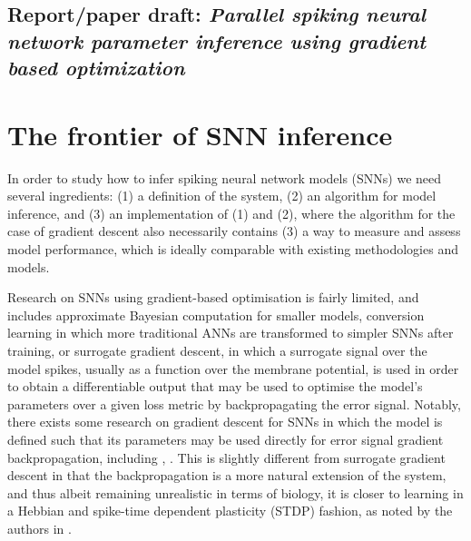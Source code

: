 \documentclass[mphil,deptreport,ianc]{infthesis} %
\begin{document}


\section{Report/paper draft: \textit{Parallel spiking neural network parameter inference using gradient based optimization}}



\chapter{The frontier of SNN inference}\label{chpt:frontier}

In order to study how to infer spiking neural network models (SNNs) we need several ingredients: (1) a definition of the system, (2) an algorithm for model inference, and (3) an implementation of (1) and (2), where the algorithm for the case of gradient descent also necessarily contains (3) a way to measure and assess model performance, which is ideally comparable with existing methodologies and models.

Research on SNNs using gradient-based optimisation is fairly limited, and includes approximate Bayesian computation for smaller models, conversion learning in which more traditional ANNs are transformed to simpler SNNs after training, or surrogate gradient descent, in which a surrogate signal over the model spikes, usually as a function over the membrane potential, is used in order to obtain a differentiable output that may be used to optimise the model's parameters over a given loss metric by backpropagating the error signal. Notably, there exists some research on gradient descent for SNNs in which the model is defined such that its parameters may be used directly for error signal gradient backpropagation, including \cite{Huh2017}, \cite{Rene2020}. This is slightly different from surrogate gradient descent in that the backpropagation is a more natural extension of the system, and thus albeit remaining unrealistic in terms of biology, it is closer to learning in a Hebbian and spike-time dependent plasticity (STDP) fashion, as noted by the authors in \cite{Huh2017}.
\end{document}
